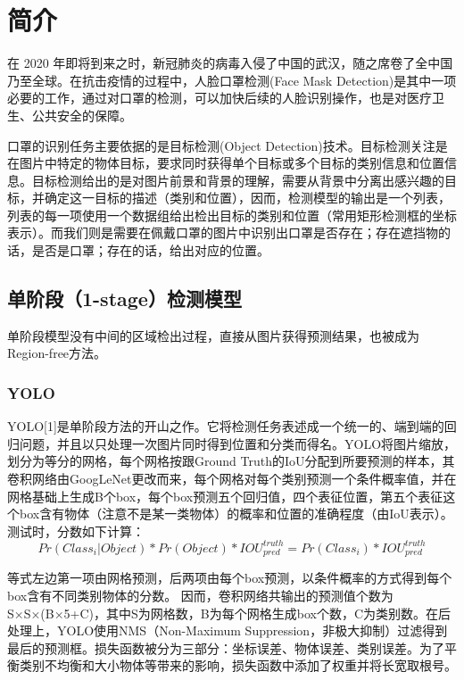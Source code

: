 \documentclass[journal,transmag]{IEEEtran}
\begin{document}
\section{简介}
% 
% 
% 
% 
在 2020 年即将到来之时，新冠肺炎的病毒入侵了中国的武汉，随之席卷了全中国乃至全球。在抗击疫情的过程中，人脸口罩检测(Face Mask Detection)是其中一项必要的工作，通过对口罩的检测，可以加快后续的人脸识别操作，也是对医疗卫生、公共安全的保障。

口罩的识别任务主要依据的是目标检测(Object Detection)技术。目标检测关注是在图片中特定的物体目标，要求同时获得单个目标或多个目标的类别信息和位置信息。目标检测给出的是对图片前景和背景的理解，需要从背景中分离出感兴趣的目标，并确定这一目标的描述（类别和位置），因而，检测模型的输出是一个列表，列表的每一项使用一个数据组给出检出目标的类别和位置（常用矩形检测框的坐标表示）。而我们则是需要在佩戴口罩的图片中识别出口罩是否存在；存在遮挡物的话，是否是口罩；存在的话，给出对应的位置。
\subsection{单阶段（1-stage）检测模型}
单阶段模型没有中间的区域检出过程，直接从图片获得预测结果，也被成为Region-free方法。
\subsubsection{YOLO}
YOLO[1]是单阶段方法的开山之作。它将检测任务表述成一个统一的、端到端的回归问题，并且以只处理一次图片同时得到位置和分类而得名。YOLO将图片缩放，划分为等分的网格，每个网格按跟Ground Truth的IoU分配到所要预测的样本，其卷积网络由GoogLeNet更改而来，每个网格对每个类别预测一个条件概率值，并在网格基础上生成B个box，每个box预测五个回归值，四个表征位置，第五个表征这个box含有物体（注意不是某一类物体）的概率和位置的准确程度（由IoU表示）。测试时，分数如下计算：
$$Pr(Class_{i}|Object)*Pr(Object)*IOU_{pred}^{truth}=Pr(Class_{i})*IOU_{pred}^{truth}$$

等式左边第一项由网格预测，后两项由每个box预测，以条件概率的方式得到每个box含有不同类别物体的分数。 因而，卷积网络共输出的预测值个数为S×S×(B×5+C)，其中S为网格数，B为每个网格生成box个数，C为类别数。在后处理上，YOLO使用NMS（Non-Maximum Suppression，非极大抑制）过滤得到最后的预测框。损失函数被分为三部分：坐标误差、物体误差、类别误差。为了平衡类别不均衡和大小物体等带来的影响，损失函数中添加了权重并将长宽取根号。
\end{document}
